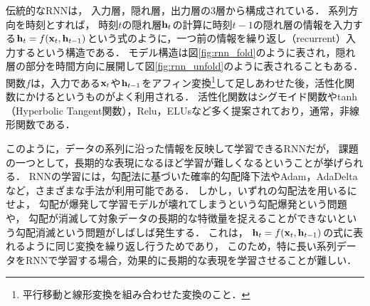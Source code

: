 \begin{figure}[t]
\begin{center}
\hspace*{-40pt}
\end{center}
\end{figure}

伝統的なRNNは，
入力層，隠れ層，出力層の3層から構成されている．
系列方向を時刻とすれば，
時刻$t$の隠れ層${\bf h}_t$の計算に時刻$t-1$の隠れ層の情報を入力する${\bf h}_t = f({\bf x}_t, {\bf h}_{t-1})$という式のように，一つ前の情報を繰り返し（recurrent）入力するという構造である．
モデル構造は図\ref{fig:rnn_fold}のように表され，隠れ層の部分を時間方向に展開して図\ref{fig:rnn_unfold}のように表されることもある．
関数$f$は，入力である${\bf x}_t$や${\bf h}_{t-1}$をアフィン変換\footnote{平行移動と線形変換を組み合わせた変換のこと．}して足しあわせた後，活性化関数にかけるというものがよく利用される．
活性化関数はシグモイド関数やtanh（Hyperbolic Tangent関数），Relu\cite{nair2010rectified}，ELUs\cite{clevert2015fast}など多く提案されており，通常，非線形関数である．



このように，データの系列に沿った情報を反映して学習できるRNNだが，
課題の一つとして，長期的な表現になるほど学習が難しくなるということが挙げられる\cite{bengio1994learning}．
RNNの学習には，勾配法に基づいた確率的勾配降下法\cite{robbins1951stochastic,kushner2003stochastic}やAdam\cite{kingma2014adam}，AdaDelta\cite{zeiler2012adadelta}など，さまざまな手法が利用可能である．
しかし，いずれの勾配法を用いるにせよ，
勾配が爆発して学習モデルが壊れてしまうという勾配爆発\cite{bengio1994learning,pascanu2013difficulty}という問題や，
勾配が消滅して対象データの長期的な特徴量を捉えることができないという勾配消滅\cite{pascanu2013difficulty, hochreiter1998vanishing}という問題がしばしば発生する．
これは，
${\bf h}_t = f({\bf x}_t, {\bf h}_{t-1})$の式に表れるように同じ変換を繰り返し行うためであり，
このため，特に長い系列データをRNNで学習する場合，効果的に長期的な表現を学習させることが難しい．


